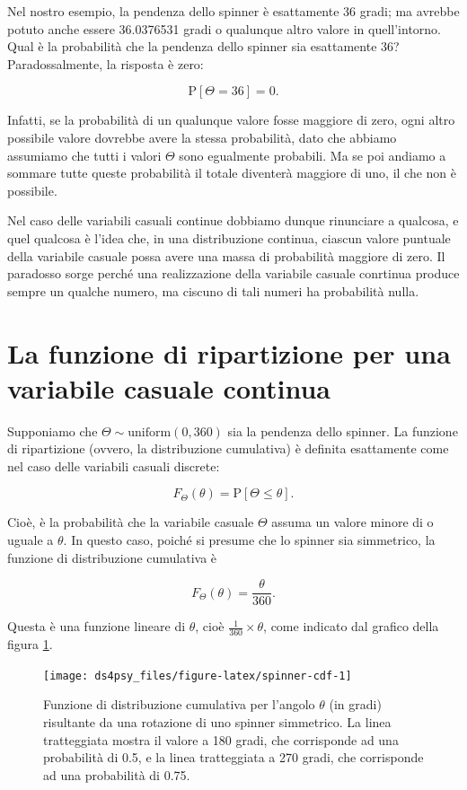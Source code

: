 \documentclass[
  11pt,
]{krantz}
\theoremstyle{definition}
\theoremstyle{definition}
\theoremstyle{definition}
\theoremstyle{definition}
\theoremstyle{remark}
\begin{document}
Nel nostro esempio, la pendenza dello spinner è esattamente 36 gradi; ma avrebbe potuto anche essere 36.0376531 gradi o qualunque altro valore in quell'intorno. Qual è la probabilità che la pendenza dello spinner sia esattamente 36? Paradossalmente, la risposta è zero:

\[
\mbox{P}[\Theta = 36] = 0.
\]

Infatti, se la probabilità di un qualunque valore fosse maggiore di zero, ogni altro possibile valore dovrebbe avere la stessa probabilità, dato che abbiamo assumiamo che tutti i valori \(\Theta\) sono egualmente probabili. Ma se poi andiamo a sommare tutte queste probabilità il totale diventerà maggiore di uno, il che non è possibile.

Nel caso delle variabili casuali continue dobbiamo dunque rinunciare a qualcosa, e quel qualcosa è l'idea che, in una distribuzione continua, ciascun valore puntuale della variabile casuale possa avere una massa di probabilità maggiore di zero. Il paradosso sorge perché una realizzazione della variabile casuale conrtinua produce sempre un qualche numero, ma ciscuno di tali numeri ha probabilità nulla.

\hypertarget{la-funzione-di-ripartizione-per-una-variabile-casuale-continua}{%
\section{La funzione di ripartizione per una variabile casuale continua}\label{la-funzione-di-ripartizione-per-una-variabile-casuale-continua}}

Supponiamo che \(\Theta \sim \mbox{uniform}(0, 360)\) sia la pendenza dello spinner. La funzione di ripartizione (ovvero, la distribuzione cumulativa) è definita esattamente come nel caso delle variabili casuali discrete:

\[
F_{\Theta}(\theta) = \mbox{P}[\Theta \leq \theta].
\]

Cioè, è la probabilità che la variabile casuale \(\Theta\) assuma un valore minore di o uguale a \(\theta\). In questo caso, poiché si presume che lo spinner sia simmetrico, la funzione di distribuzione cumulativa è

\[
F_{\Theta}(\theta) = \frac{\theta}{360}.
\]

Questa è una funzione lineare di \(\theta\), cioè \(\frac{1}{360} \times \theta\), come indicato dal grafico della figura \ref{fig:spinner-cdf}.

\begin{figure}[h]

{\centering \texttt{[image: ds4psy\_files/figure-latex/spinner-cdf-1]} 

}

\caption{Funzione di distribuzione cumulativa per l'angolo $\theta$ (in gradi) risultante da una rotazione di uno spinner simmetrico. La linea tratteggiata mostra il valore a 180 gradi, che corrisponde ad una probabilità di 0.5, e la linea tratteggiata a 270 gradi, che corrisponde ad una probabilità di 0.75.}\label{fig:spinner-cdf}
\end{figure}
\end{document}
